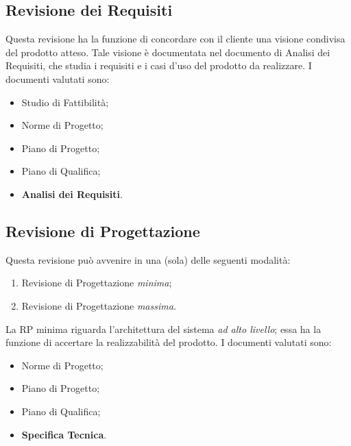\documentclass[a4paper]{article}
\begin{document}
		
	\subsection{Revisione dei Requisiti}

		
Questa revisione ha la funzione di concordare con il cliente una visione condivisa del prodotto atteso. Tale visione è documentata nel documento di Analisi dei Requisiti, che studia i requisiti e i casi d'uso del prodotto da realizzare. I documenti valutati sono:
		
	\begin{itemize}
		
			
	\item Studio di Fattibilità;
			
	\item Norme di Progetto;
			
	\item Piano di Progetto;
			
	\item Piano di Qualifica;
			
	\item \textbf{Analisi dei Requisiti}.
		
	\end{itemize}


		
	\subsection{Revisione di Progettazione}

		
Questa revisione può avvenire in una (sola) delle seguenti modalità:
		
	\begin{enumerate}
		
			
	\item Revisione di Progettazione \emph{minima};
			
	\item Revisione di Progettazione \emph{massima}.
		
	\end{enumerate}

		
La RP minima riguarda l'architettura del sistema \emph{ad alto livello}; essa ha la funzione di accertare la realizzabilità del prodotto. I documenti valutati sono:
		
	\begin{itemize}
		
			
	\item Norme di Progetto;
			
	\item Piano di Progetto;
			
	\item Piano di Qualifica;
			
	\item \textbf{Specifica Tecnica}.
		
	\end{itemize}
\end{document}
